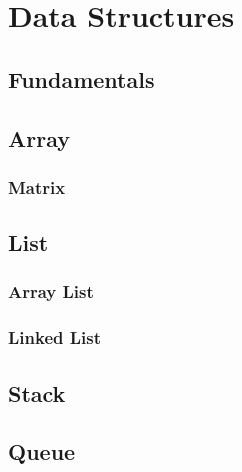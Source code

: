 \chapter{Data Structures}


\section{Fundamentals}


\section{Array}


\subsection{Matrix}


\section{List}


\subsection{Array List}


\subsection{Linked List}


\section{Stack}


\section{Queue}

